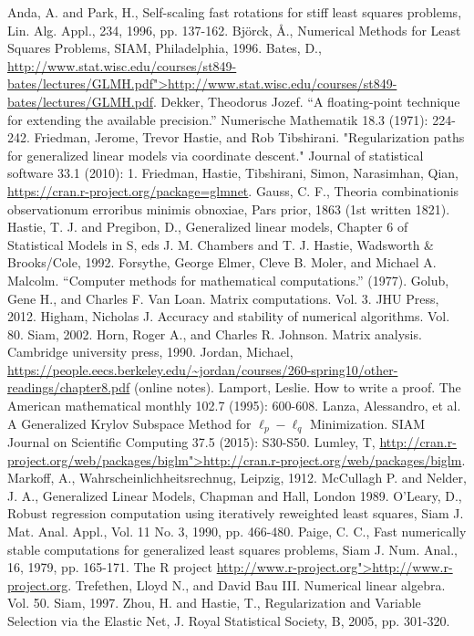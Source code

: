 \documentclass[10pt]{article} %
\begin{document}
\begin{thebibliography}{99}
 Anda, A. and Park, H., Self-scaling fast rotations for stiff least squares problems, Lin. Alg. Appl., 234, 1996, pp. 137-162.
 Bj\"orck, \AA.,  Numerical Methods for Least Squares Problems, SIAM, Philadelphia, 1996.
 Bates, D., \url{http://www.stat.wisc.edu/courses/st849-bates/lectures/GLMH.pdf">http://www.stat.wisc.edu/courses/st849-bates/lectures/GLMH.pdf}.
Dekker, Theodorus Jozef. ``A floating-point technique for extending the available precision.'' Numerische Mathematik 18.3 (1971): 224-242.
 Friedman, Jerome, Trevor Hastie, and Rob Tibshirani. "Regularization paths for generalized linear models via coordinate descent." Journal of statistical software 33.1 (2010): 1.
 Friedman, Hastie, Tibshirani, Simon, Narasimhan, Qian, \url{https://cran.r-project.org/package=glmnet}.
 Gauss, C. F., Theoria combinationis observationum erroribus minimis obnoxiae, Pars prior, 1863 (1st written 1821).
 Hastie, T. J. and Pregibon, D., Generalized linear models, Chapter 6 of Statistical Models in S, eds J. M. Chambers and T.  J. Hastie, Wadsworth \& Brooks/Cole, 1992.
 Forsythe, George Elmer, Cleve B. Moler, and Michael A. Malcolm. ``Computer methods for mathematical computations.'' (1977).
 Golub, Gene H., and Charles F. Van Loan. Matrix computations. Vol. 3. JHU Press, 2012.
 Higham, Nicholas J. Accuracy and stability of numerical algorithms. Vol. 80. Siam, 2002.
 Horn, Roger A., and Charles R. Johnson. Matrix analysis. Cambridge university press, 1990.
 Jordan, Michael, \url{https://people.eecs.berkeley.edu/~jordan/courses/260-spring10/other-readings/chapter8.pdf} (online notes).
 Lamport, Leslie. How to write a proof. The American mathematical monthly 102.7 (1995): 600-608.
Lanza, Alessandro, et al. A Generalized Krylov Subspace Method for $\ell_p-\ell_q$ Minimization. SIAM Journal on Scientific Computing 37.5 (2015): S30-S50.
 Lumley, T, \url{http://cran.r-project.org/web/packages/biglm">http://cran.r-project.org/web/packages/biglm}.
 Markoff, A., Wahrscheinlichheitsrechnug,  Leipzig, 1912.
 McCullagh P. and Nelder, J. A., Generalized Linear Models, Chapman and Hall, London 1989.
 O'Leary, D., Robust regression computation using iteratively reweighted least squares, Siam J. Mat. Anal. Appl., Vol. 11 No. 3, 1990, pp. 466-480.
 Paige, C. C., Fast numerically stable computations for generalized least squares problems, Siam J. Num. Anal., 16, 1979, pp. 165-171.
 The R project \url{http://www.r-project.org">http://www.r-project.org}.
 Trefethen, Lloyd N., and David Bau III. Numerical linear algebra. Vol. 50. Siam, 1997.
 Zhou, H. and Hastie, T., Regularization and Variable Selection via the Elastic Net, J. Royal Statistical Society, B, 2005, pp. 301-320.
\end{thebibliography}
\end{document}

